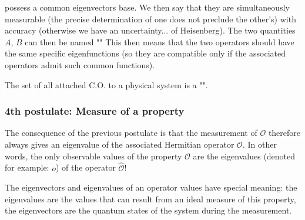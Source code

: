 	possess a common eigenvectors base. We then say that they are simultaneously measurable (the precise determination of one does not preclude the other's) with accuracy (otherwise we have an uncertainty... of Heisenberg). The two quantities $A$, $B$ can then be named "" This then means that the two operators should have the same specific eigenfunctions (so they are compatible only if the associated operators admit such common functions).
	
	The set of all attached C.O. to a physical system is a "".
	
	\subsubsection{4th postulate: Measure of a property}	
	The consequence of the previous postulate is that the measurement of $\mathcal{O}$ therefore always gives an eigenvalue of the associated Hermitian operator $\hat{\mathcal{O}}$. In other words, the only observable values of the property $\mathcal{O}$ are the eigenvalues (denoted for example: $o$) of the operator $\hat{\mathcal{O}}$!
	
	
	The eigenvectors and eigenvalues of an operator values have special meaning: the eigenvalues are the values that can result from an ideal measure of this property, the eigenvectors are the quantum states of the system during the measurement.
	
